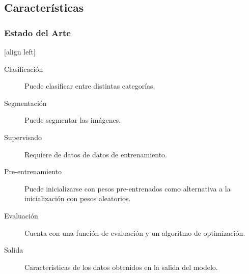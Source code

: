 \documentclass{beamer}
\begin{document}
\subsection{Características}
\begin{frame}
    \frametitle{Estado del Arte}
    [align left]
    \begin{description}
        \item[Clasificación]{Puede clasificar entre distintas categorías.}
        \item[Segmentación]{Puede segmentar las imágenes.}
        \item[Supervisado]{Requiere de datos de datos de entrenamiento.}
        \item[Pre-entrenamiento]{Puede inicializarse con pesos pre-entrenados como alternativa a la inicialización con pesos aleatorios.}
        \item[Evaluación]{Cuenta con una función de evaluación y un algoritmo de optimización.}
        \item[Salida]{Características de los datos obtenidos en la salida del modelo.}
    \end{description}
\end{frame}
\end{document}
